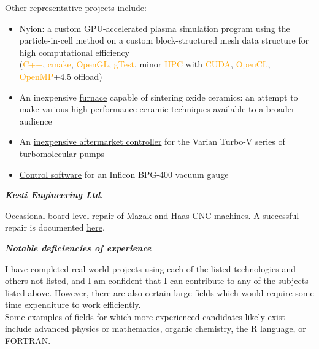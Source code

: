 \documentclass[fleqn,11pt]{article}
\newcommand{\ressection}[1]{\textbf{{\Large \textit{#1}}}\xrfill[0.1ex]{0.6pt}}
\newcommand{\sk}[1]{\textcolor{orange}{#1}}
\newcommand{\itemoptions}{\setlength{\itemindent}{-10pt} \setlength\itemsep{-1em}}
\begin{document}

Other representative projects include:


\begin{itemize}\itemoptions
	\item \href{https://github.com/0xDBFB7/Nyion}{Nyion}: a custom GPU-accelerated plasma simulation program using the particle-in-cell method on a custom block-structured mesh data structure for high computational efficiency\\
	(\sk{C++}, \sk{cmake}, \sk{OpenGL}, \sk{gTest}, minor \sk{HPC} with \sk{CUDA}, \sk{OpenCL}, \sk{OpenMP}+4.5 offload)
	\item An inexpensive \href{https://0xdbfb7.com/furnace.html}{furnace} capable of sintering oxide ceramics: an attempt to make various high-performance ceramic techniques available to a broader audience%
	\item An \href{https://github.com/0xDBFB7/varian-turbo-controller}{inexpensive aftermarket controller} for the Varian Turbo-V series of turbomolecular pumps 
	\item \href{https://gist.github.com/0xDBFB7/7bd7048c6639270e6f291a2673903184}{Control software} for an Inficon BPG-400 vacuum gauge
\end{itemize}








\ressection{Kesti Engineering Ltd.}

Occasional board-level repair of Mazak and Haas CNC machines. A successful repair is documented \href{https://0xdbfb7.com/meldas.html}{here}.

\ressection{Notable deficiencies of experience}

I have completed real-world projects using each of the listed technologies and others not listed, and I am confident that I can contribute to any of the subjects listed above. However, there are also certain large fields which would require some time expenditure to work efficiently.\\ Some examples of fields for which more experienced candidates likely exist include advanced physics or mathematics, organic chemistry, the R language, or FORTRAN.
\end{document}

